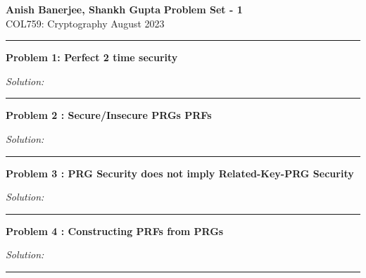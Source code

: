 \documentclass[a4paper, 11pt]{article}
\newcommand{\hr}{\noindent\rule{7in}{2.8pt}}
\newenvironment{solution}
    {\textit{Solution:}}
    {\hr}
\newcommand{\prob}[1]{\begin{mdframed}[backgroundcolor=gray!20] \textbf{Problem #1}\end{mdframed}}
\begin{document}
\noindent

\large\textbf{Anish Banerjee, Shankh Gupta} \hfill \textbf{Problem Set - 1}   \\
\normalsize COL759: Cryptography \hfill August 2023\\
\hr


\prob{1: Perfect 2 time security}
\begin{solution}

\end{solution}


\prob{2 : Secure/Insecure PRGs PRFs}
\begin{solution}

\end{solution} 

\prob{3 : PRG Security does not imply Related-Key-PRG Security}
\begin{solution}

\end{solution} 


\prob{4 : Constructing PRFs from PRGs}
\begin{solution}

\end{solution} 
\end{document}
